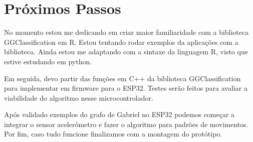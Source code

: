 \section{Próximos Passos}

No momento estou me dedicando em criar maior familiaridade com a biblioteca GGClassification
em R. Estou tentando rodar exemplos da aplicações com a biblioteca. Ainda estou me adaptando 
com a sintaxe da linguagem R, visto que estive estudando em python.

Em seguida, devo partir das funções em C++ da biblioteca GGClassification para implementar em firmware
para o ESP32. Testes serão feitos para avaliar a viabilidade do algoritmo nesse microcontrolador.

Após validado exemplos do grafo de Gabriel no ESP32 podemos começar a integrar o sensor acelerômetro e fazer
o algoritmo para padrões de movimentos. Por fim, caso tudo funcione finalizamos com a montagem do protótipo.